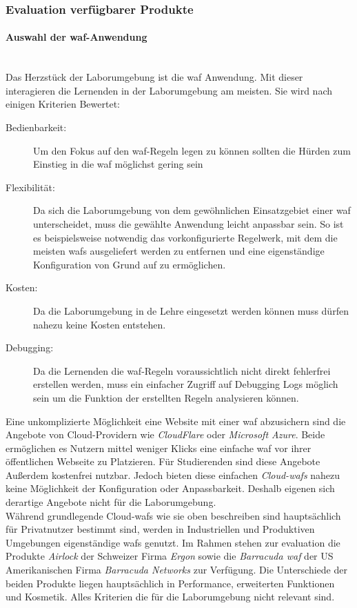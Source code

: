 \subsubsection{Evaluation verfügbarer Produkte}
\label{sec:product-evaluation}

\paragraph{Auswahl der \ac{waf}-Anwendung}\ \\

Das Herzstück der Laborumgebung ist die \ac{waf} Anwendung.
Mit dieser interagieren die Lernenden in der Laborumgebung am meisten.
Sie wird nach einigen Kriterien Bewertet:
\begin{description}
    \item[Bedienbarkeit:] Um den Fokus auf den \ac{waf}-Regeln legen zu können sollten die Hürden zum Einstieg in die \ac{waf} möglichst gering sein
    \item[Flexibilität:] Da sich die Laborumgebung von dem gewöhnlichen Einsatzgebiet einer \ac{waf} unterscheidet, muss die gewählte Anwendung leicht anpassbar sein.
    So ist es beispielsweise notwendig das vorkonfigurierte Regelwerk, mit dem die meisten \acp{waf} ausgeliefert werden zu entfernen und eine eigenständige Konfiguration von Grund auf zu ermöglichen.
    \item[Kosten:] Da die Laborumgebung in de Lehre eingesetzt werden können muss dürfen nahezu keine Kosten entstehen.
    \item[Debugging:] Da die Lernenden die \ac{waf}-Regeln voraussichtlich nicht direkt fehlerfrei erstellen werden, muss ein einfacher Zugriff auf Debugging Logs möglich sein um die Funktion der erstellten Regeln analysieren können.
\end{description}

Eine unkomplizierte Möglichkeit eine Website mit einer \ac{waf} abzusichern sind die Angebote von Cloud-Providern wie \textit{CloudFlare} oder \textit{Microsoft Azure}.
Beide ermöglichen es Nutzern mittel weniger Klicks eine einfache \ac{waf} vor ihrer öffentlichen Webseite zu Platzieren.
Für Studierenden sind diese Angebote Außerdem kostenfrei nutzbar.
Jedoch bieten diese einfachen \textit{Cloud-\acp{waf}} nahezu keine Möglichkeit der Konfiguration oder Anpassbarkeit.
Deshalb eigenen sich derartige Angebote nicht für die Laborumgebung.\\

Während grundlegende Cloud-\acp{waf} wie sie oben beschreiben sind hauptsächlich für Privatnutzer bestimmt sind, werden in Industriellen und Produktiven Umgebungen eigenständige \acp{waf} genutzt.
Im Rahmen stehen zur evaluation die Produkte \textit{Airlock} der Schweizer Firma \textit{Ergon} sowie die \textit{Barracuda \ac{waf}} der US Amerikanischen Firma \textit{Barracuda Networks} zur Verfügung.
Die Unterschiede der beiden Produkte liegen hauptsächlich in Performance, erweiterten Funktionen und Kosmetik.
Alles Kriterien die für die Laborumgebung nicht relevant sind.

